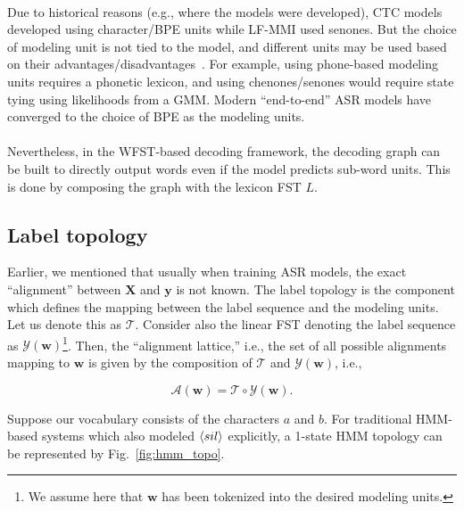 \paragraph{} Due to historical reasons (e.g., where the models were developed), CTC models developed using character/BPE units while LF-MMI used senones. 
%
But the choice of modeling unit is not tied to the model, and different units may be used based on their advantages/disadvantages~\cite{zhang_lattice-free_2021}. 
%
For example, using phone-based modeling units requires a phonetic lexicon, and using chenones/senones would require state tying using likelihoods from a GMM. 
%
Modern ``end-to-end'' ASR models have converged to the choice of BPE as the modeling units.

\paragraph{} Nevertheless, in the WFST-based decoding framework, the decoding graph can be built to directly output words even if the model predicts sub-word units. 
%
This is done by composing the graph with the lexicon FST $L$.


\subsection{Label topology}

Earlier, we mentioned that usually when training ASR models, the exact ``alignment'' between $\mathbf{X}$ and $\mathbf{y}$ is not known. 
%
The label topology is the component which defines the mapping between the label sequence and the modeling units. 
%
Let us denote this as $\mathcal{T}$. 
%
Consider also the linear FST denoting the label sequence as $\mathcal{Y}(\mathbf{w})$\footnote{We assume here that $\mathbf{w}$ has been tokenized into the desired modeling units.}. 
%
Then, the ``alignment lattice,'' i.e., the set of all possible alignments mapping to $\mathbf{w}$ is given by the composition of $\mathcal{T}$ and $\mathcal{Y}(\mathbf{w})$, i.e.,

\begin{equation}
    \mathcal{A}(\mathbf{w}) = \mathcal{T} \circ \mathcal{Y}(\mathbf{w}).
\end{equation}

Suppose our vocabulary consists of the characters $a$ and $b$. 
%
For traditional HMM-based systems which also modeled $\langle sil \rangle$ explicitly, a 1-state HMM topology can be represented by Fig.~\ref{fig:hmm_topo}.

